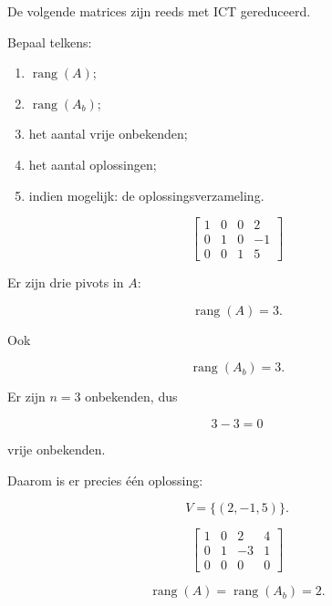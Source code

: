 \documentclass{ximera}
\begin{document}
\begin{oefening}{\oefB\ESS}

De volgende matrices zijn reeds met ICT gereduceerd.

Bepaal telkens:

\begin{enumerate}
    \item \(\operatorname{rang}(A)\);
    \item \(\operatorname{rang}(A_b)\);
    \item het aantal vrije onbekenden;
    \item het aantal oplossingen;
    \item indien mogelijk: de oplossingsverzameling.
\end{enumerate}


\begin{question}

\[
\left[
\begin{array}{ccc|c}
1&0&0&2\\
0&1&0&-1\\
0&0&1&5
\end{array}
\right]
\]

\begin{oplossing}

Er zijn drie pivots in \(A\):

\[
\operatorname{rang}(A)=3.
\]

Ook

\[
\operatorname{rang}(A_b)=3.
\]

Er zijn \(n=3\) onbekenden, dus

\[
3-3=0
\]

vrije onbekenden.

Daarom is er precies één oplossing:

\[
V=\{(2,-1,5)\}.
\]

\end{oplossing}

\end{question}


\begin{question}

\[
\left[
\begin{array}{ccc|c}
1&0&2&4\\
0&1&-3&1\\
0&0&0&0
\end{array}
\right]
\]

\begin{oplossing}

\[
\operatorname{rang}(A)
=
\operatorname{rang}(A_b)
=
2.
\]


\end{oplossing}
\end{question}
\end{oefening}
\end{document}
